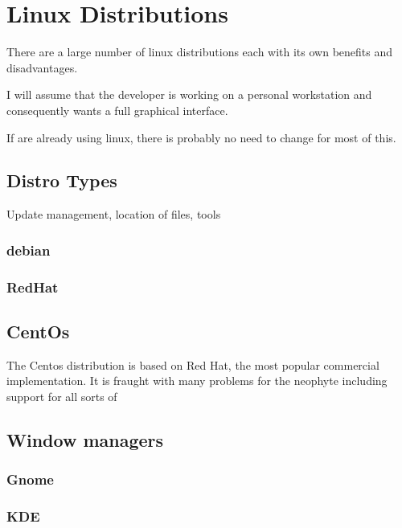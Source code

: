 \chapter{Linux Distributions}
There are a large number of linux distributions each with its own benefits and disadvantages.

I will assume that the developer is working on a personal workstation and consequently wants a full graphical interface.

If are already using linux, there is probably no need to change for most of this.
\section{Distro Types}
Update management, location of files, tools
\subsection{debian}
\subsection{RedHat}
\section{CentOs}
The Centos distribution is based on Red Hat, the most popular commercial implementation.  It is fraught with many problems for
the neophyte including support for all sorts of 
\section{Window managers}
\subsection{Gnome}
\subsection{KDE}


